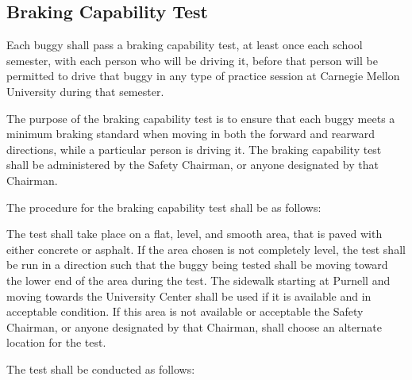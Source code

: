 \subsection{Braking Capability Test}

	Each buggy shall pass a braking capability test, at least once each school
	semester, with each person who will be driving it, before that person will be
	permitted to drive that buggy in any type of practice session at Carnegie
	Mellon University during that semester.

	The purpose of the braking capability test is to ensure that each buggy meets a
	minimum braking standard when moving in both the forward and rearward
	directions, while a particular person is driving it. The braking capability
	test shall be administered by the Safety Chairman, or anyone designated by that
	Chairman. 
	\newline

	\noindent The procedure for the braking capability test shall be as follows:

	The test shall take place on a flat, level, and smooth area, that is paved with
	either concrete or asphalt. If the area chosen is not completely level, the
	test shall be run in a direction such that the buggy being tested shall be
	moving toward the lower end of the area during the test. The sidewalk starting at
	Purnell and moving towards the University Center shall be used if it is available 
	and in acceptable condition. If this area is not available or acceptable the 
	Safety Chairman, or anyone designated by that Chairman, shall choose an alternate 
	location for the test.
	\newline

	\noindent The test shall be conducted as follows:

